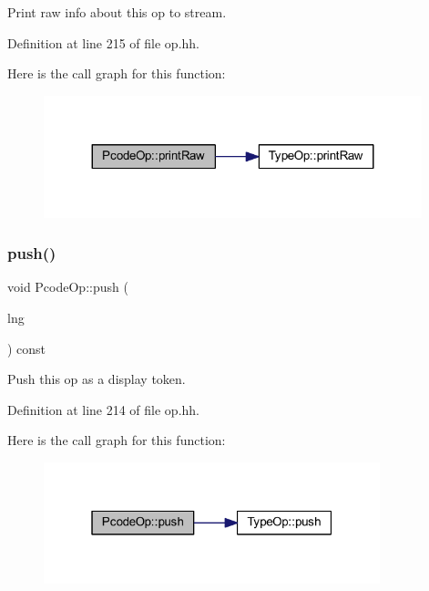 Print raw info about this op to stream. 



Definition at line 215 of file op.\+hh.

Here is the call graph for this function\+:
\nopagebreak
\begin{figure}[H]
\begin{center}
\leavevmode
\includegraphics[width=311pt]{class_pcode_op_ac0876c5f6b45db26101ff7ea1636e28f_cgraph}
\end{center}
\end{figure}
\mbox{\label{class_pcode_op_a8f2fa24d19c6744948804eb75388deb9}} 
\subsubsection{\texorpdfstring{push()}{push()}}
{\footnotesize\ttfamily void Pcode\+Op\+::push (\begin{DoxyParamCaption}\item[{\mbox{\hyperlink{class_print_language}{Print\+Language}} $\ast$}]{lng }\end{DoxyParamCaption}) const\hspace{0.3cm}{\ttfamily [inline]}}



Push this op as a display token. 



Definition at line 214 of file op.\+hh.

Here is the call graph for this function\+:
\nopagebreak
\begin{figure}[H]
\begin{center}
\leavevmode
\includegraphics[width=277pt]{class_pcode_op_a8f2fa24d19c6744948804eb75388deb9_cgraph}
\end{center}
\end{figure}
\mbox{\label{class_pcode_op_a4fc0474bc30c981150acade20eaa1262}} 
